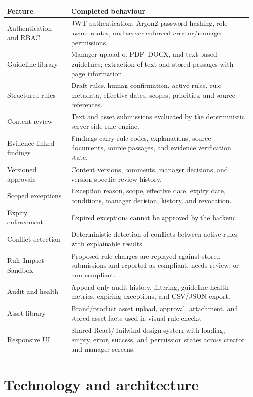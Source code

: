\documentclass[11pt,a4paper]{article}
\begin{document}
\begin{longtable}{p{}p{}}
\toprule
\textbf{Feature} & \textbf{Completed behaviour}\\
\midrule
\endhead
Authentication and RBAC & JWT authentication, Argon2 password hashing, role-aware routes, and server-enforced creator/manager permissions.\\
Guideline library & Manager upload of PDF, DOCX, and text-based guidelines; extraction of text and stored passages with page information.\\
Structured rules & Draft rules, human confirmation, active rules, rule metadata, effective dates, scopes, priorities, and source references.\\
Content review & Text and asset submissions evaluated by the deterministic server-side rule engine.\\
Evidence-linked findings & Findings carry rule codes, explanations, source documents, source passages, and evidence verification state.\\
Versioned approvals & Content versions, comments, manager decisions, and version-specific review history.\\
Scoped exceptions & Exception reason, scope, effective date, expiry date, conditions, manager decision, history, and revocation.\\
Expiry enforcement & Expired exceptions cannot be approved by the backend.\\
Conflict detection & Deterministic detection of conflicts between active rules with explainable results.\\
Rule Impact Sandbox & Proposed rule changes are replayed against stored submissions and reported as compliant, needs review, or non-compliant.\\
Audit and health & Append-only audit history, filtering, guideline health metrics, expiring exceptions, and CSV/JSON export.\\
Asset library & Brand/product asset upload, approval, attachment, and stored asset facts used in visual rule checks.\\
Responsive UI & Shared React/Tailwind design system with loading, empty, error, success, and permission states across creator and manager screens.\\
\bottomrule
\end{longtable}

\section{Technology and architecture}
\end{document}

